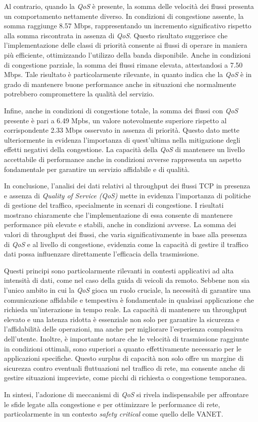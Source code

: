 Al contrario, quando la \textit{QoS} è presente, la somma delle velocità dei flussi presenta un comportamento nettamente diverso. In condizioni di congestione assente, la somma raggiunge 8.57 Mbps, rappresentando un incremento significativo rispetto alla somma riscontrata in assenza di \textit{QoS}. Questo risultato suggerisce che l'implementazione delle classi di priorità consente ai flussi di operare in maniera più efficiente, ottimizzando l'utilizzo della banda disponibile. Anche in condizioni di congestione parziale, la somma dei flussi rimane elevata, attestandosi a 7.50 Mbps. Tale risultato è particolarmente rilevante, in quanto indica che la \textit{QoS} è in grado di mantenere buone performance anche in situazioni che normalmente potrebbero compromettere la qualità del servizio.

Infine, anche in condizioni di congestione totale, la somma dei flussi con \textit{QoS} presente è pari a 6.49 Mpbs, un valore notevolmente superiore rispetto al corrispondente 2.33 Mbps osservato in assenza di priorità. Questo dato mette ulteriormente in evidenza l'importanza di quest'ultima nella mitigazione degli effetti negativi della congestione. La capacità della \textit{QoS} di mantenere un livello accettabile di performance anche in condizioni avverse rappresenta un aspetto fondamentale per garantire un servizio affidabile e di qualità.

In conclusione, l'analisi dei dati relativi al throughput dei flussi TCP in presenza e assenza di \textit{Quality of Service (QoS)} mette in evidenza l'importanza di politiche di gestione del traffico, specialmente in scenari di congestione. I risultati mostrano chiaramente che l'implementazione di essa consente di mantenere performance più elevate e stabili, anche in condizioni avverse. La somma dei valori di throughput dei flussi, che varia significativamente in base alla presenza di \textit{QoS} e al livello di congestione, evidenzia come la capacità di gestire il traffico dati possa influenzare direttamente l'efficacia della trasmissione.

Questi principi sono particolarmente rilevanti in contesti applicativi ad alta intensità di dati, come nel caso della guida di veicoli da remoto. Sebbene non sia l'unico ambito in cui la \textit{QoS} gioca un ruolo cruciale, la necessità di garantire una comunicazione affidabile e tempestiva è fondamentale in qualsiasi applicazione che richieda un'interazione in tempo reale. La capacità di mantenere un throughput elevato e una latenza ridotta è essenziale non solo per garantire la sicurezza e l'affidabilità delle operazioni, ma anche per migliorare l'esperienza complessiva dell'utente. Inoltre, è importante notare che le velocità di trasmissione raggiunte in condizioni ottimali, sono superiori a quanto effettivamente necessario per le applicazioni specifiche. Questo surplus di capacità non solo offre un margine di sicurezza contro eventuali fluttuazioni nel traffico di rete, ma consente anche di gestire situazioni impreviste, come picchi di richiesta o congestione temporanea.

In sintesi, l'adozione di meccanismi di \textit{QoS} si rivela indispensabile per affrontare le sfide legate alla congestione e per ottimizzare le performance di rete, particolarmente in un contesto \textit{safety critical} come quello delle VANET.